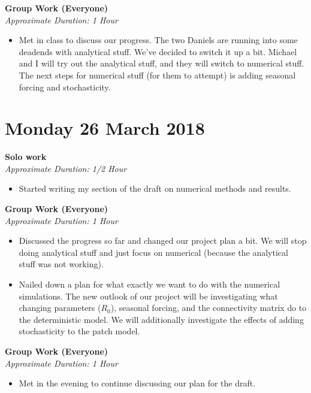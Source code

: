 \documentclass[12pt]{article}\usepackage[]{graphicx}\usepackage[]{color}
\begin{document}
\begin{itemize}
\textbf{Group Work (Everyone)} \\
\emph{Approximate Duration: 1 Hour}

\begin{itemize}
\item Met in class to discuss our progress. The two Daniels are running into some deadends with analytical stuff. We've decided to switch it up a bit.  Michael and I will try out the analytical stuff, and they will switch to numerical stuff. The next steps for numerical stuff (for them to attempt) is adding seasonal forcing and stochasticity.
\end{itemize}

\section*{Monday 26 March 2018}
\textbf{Solo work} \\
\emph{Approximate Duration: 1/2 Hour}

\begin{itemize}
\item Started writing my section of the draft on numerical methods and results. 
\end{itemize}

\textbf{Group Work (Everyone)} \\
\emph{Approximate Duration: 1 Hour}

\begin{itemize}
\item Discussed the progress so far and changed our project plan a bit. We will stop doing analytical stuff and just focus on numerical (because the analytical stuff was not working).
\item Nailed down a plan for what exactly we want to do with the numerical simulations. The new outlook of our project will be investigating what changing parameters ($R_0$), seasonal forcing, and the connectivity matrix do to the deterministic model. We will additionally investigate the effects of adding stochasticity to the patch model.
\end{itemize}

\textbf{Group Work (Everyone)} \\
\emph{Approximate Duration: 1 Hour}

\begin{itemize}
\item Met in the evening to continue discussing our plan for the draft.
\end{itemize}


\end{itemize}
\end{document}
